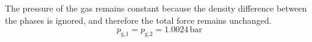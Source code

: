 The pressure of the gas remains constant because the density difference between the phases is ignored, and therefore the total force remains unchanged.  
\[
p_{\text{g,1}} = p_{\text{g,2}} = 1.0024 \, \text{bar}
\]